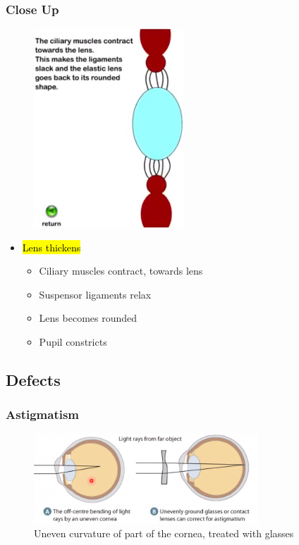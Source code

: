 \documentclass[a4paper,12pt]{article}
\begin{document}
\subsubsection{Close Up}
\begin{figure}[H]
    \centering
    \includegraphics[width=0.50\textwidth]{close}
\end{figure}
\begin{itemize}
    \item{
            \hl{Lens thickens}
            \begin{itemize}
                \item{Ciliary muscles contract, towards lens}
                \item{Suspensor ligaments relax}
                \item{Lens becomes rounded}
                \item{Pupil constricts}
            \end{itemize}
        }
\end{itemize}

\subsection{Defects}
\subsubsection{Astigmatism}
\begin{figure}[H]
    \centering
    \includegraphics[width=0.75\textwidth]{astigmatism}
    \caption{Uneven curvature of part of the cornea, treated with glasses}
\end{figure}
\end{document}
